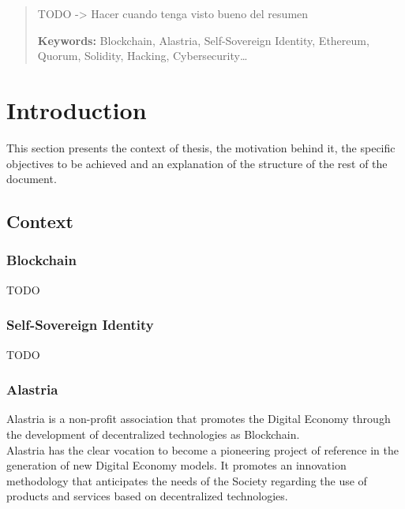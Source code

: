 \documentclass[a4paper, 12pt]{article} %
\begin{document}
\newpage

\begin{abstract}
    \normalsize
    TODO
    -> Hacer cuando tenga visto bueno del resumen
    
    \textbf{Keywords:} Blockchain, Alastria, Self-Sovereign Identity, Ethereum, Quorum, Solidity, Hacking, Cybersecurity\ldots
\end{abstract}

\newpage
{} %

\section{Introduction}
    This section presents the context of thesis, the motivation behind it, the specific objectives to be achieved and an explanation of the structure of the rest of the document.
    
    \subsection{Context}
        \subsubsection{Blockchain}
            TODO
            
        \subsubsection{Self-Sovereign Identity}
            TODO
            
        \subsubsection{Alastria}
        Alastria is a non-profit association that promotes the Digital Economy through the development of decentralized technologies as Blockchain.\\
        
        Alastria has the clear vocation to become a pioneering project of reference in the generation of new Digital Economy models. It promotes an innovation methodology that anticipates the needs of the Society regarding the use of products and services based on decentralized technologies.\\
        
\end{document}
